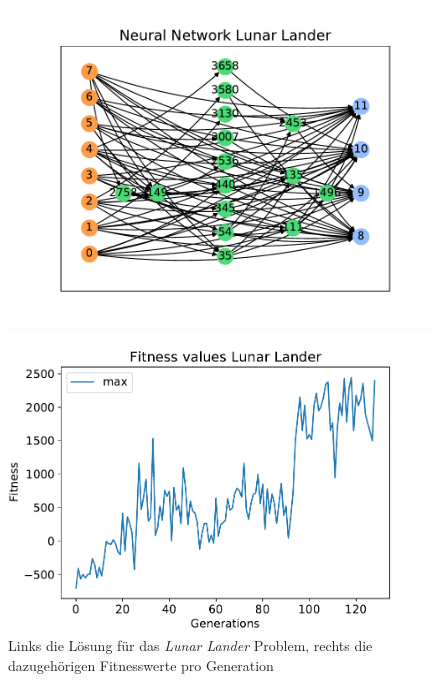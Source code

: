 \begin{figure}[!h]
	\centering
	\begin{minipage}[]{0.49\textwidth}
		\includegraphics[width=1.0\textwidth]{./img/lunar_lander/lunar_lander_network.pdf} 
	\end{minipage}
	\hfill
	\begin{minipage}[]{0.49\textwidth}
		\includegraphics[width=1.0\textwidth]{./img/lunar_lander/lunar_lander_fitness.pdf} 
	\end{minipage}
	\caption{Links die Lösung für das \emph{Lunar Lander} Problem, rechts die dazugehörigen Fitnesswerte pro Generation}
	\label{fig:lunar_lander_neural_network_and_fitness}
\end{figure}
